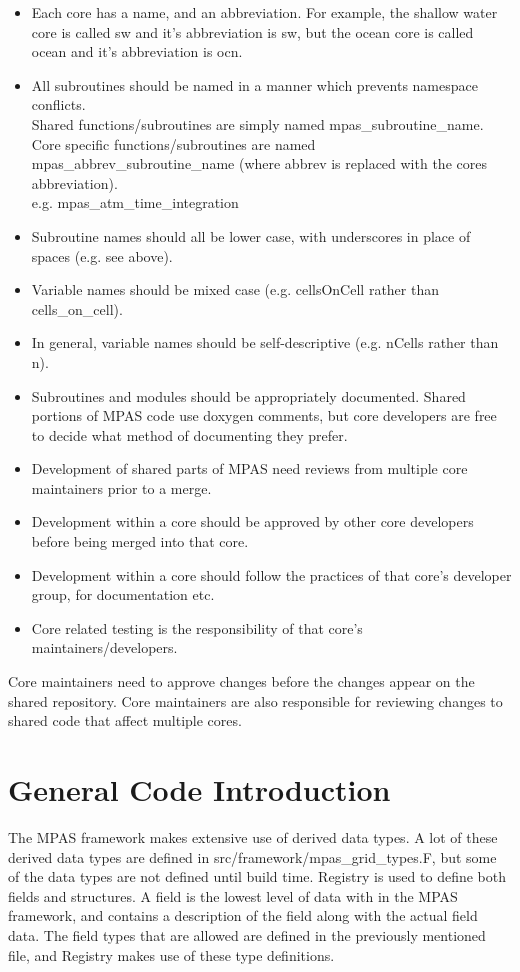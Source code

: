 \documentclass[11pt]{report}
\begin{document}
\begin{itemize}
	\item Each core has a name, and an abbreviation. For example, the shallow water core is called sw and it's abbreviation is sw, but the ocean core is called ocean and it's abbreviation is ocn.
	\item All subroutines should be named in a manner which prevents namespace conflicts. \\ 
		  Shared functions/subroutines are simply named mpas\_subroutine\_name.\\ 
		  Core specific functions/subroutines are named mpas\_abbrev\_subroutine\_name (where abbrev is replaced with the cores abbreviation). \\
		  e.g. mpas\_atm\_time\_integration
    \item Subroutine names should all be lower case, with underscores in place of spaces (e.g. see above).
	\item Variable names should be mixed case (e.g. cellsOnCell rather than cells\_on\_cell).
	\item In general, variable names should be self-descriptive (e.g. nCells rather than n).
	\item Subroutines and modules should be appropriately documented. Shared portions of MPAS code use doxygen comments, but core developers are free to decide what method of documenting they prefer.
	\item Development of shared parts of MPAS need reviews from multiple core maintainers prior to a merge.
	\item Development within a core should be approved by other core developers before being merged into that core.
	\item Development within a core should follow the practices of that core's developer group, for documentation etc.
	\item Core related testing is the responsibility of that core's maintainers/developers.
\end{itemize}

Core maintainers need to approve changes before the changes appear on the
shared repository. Core maintainers are also responsible for reviewing changes
to shared code that affect multiple cores.

\section{General Code Introduction}
\label{sec:code_intro}
The MPAS framework makes extensive use of derived data types. A lot of these
derived data types are defined in src/framework/mpas\_grid\_types.F, but some
of the data types are not defined until build time. Registry is used to define
both fields and structures. A field is the lowest level of data with in the
MPAS framework, and contains a description of the field along with the actual
field data. The field types that are allowed are defined in the previously
mentioned file, and Registry makes use of these type definitions.
\end{document}
